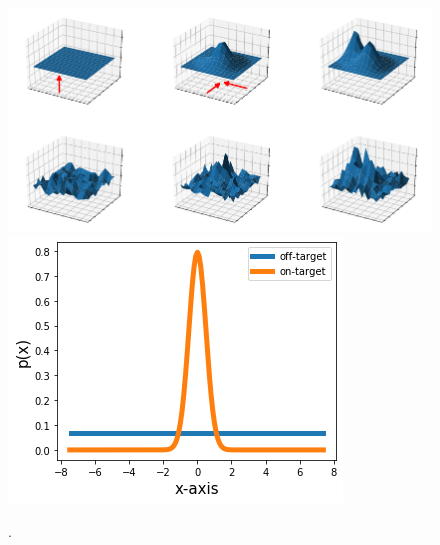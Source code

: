 \begin{figure}
\includegraphics[width=\linewidth]{figures/figure2.png}
\includegraphics[width=\linewidth]{figures/figure2g.png}
\caption{.}
\label{fig:model}
\end{figure}

